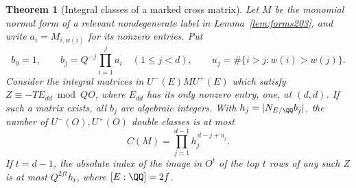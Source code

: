 \documentclass[a4paper,11pt]{article}
\newtheorem{theorem}[proposition]{Theorem}
\theoremstyle{definition}
\theoremstyle{remark}
\numberwithin{equation}{section}
\begin{document}
\begin{theorem}[Integral classes of a marked cross matrix]
\label{thm:crossclasses230}
Let \(M\) be the monomial normal form of a relevant
nondegenerate label in Lemma~\ref{lem:forms203}, and write
\(a_i=M_{i,w(i)}\) for its nonzero entries. Put
\[
 b_0=1,\qquad b_j=Q^{-j}\prod_{i=1}^j a_i\quad(1\le j<d),
 \qquad
 u_j=\#\{i>j:w(i)>w(j)\}.
\]
Consider the integral matrices in \(U^-(E)M U^+(E)\)
which satisfy \(Z\equiv-T E_{dd}\bmod QO\), where
\(E_{dd}\) has its only nonzero entry, one, at \((d,d)\).
If such a matrix exists, all \(b_j\) are algebraic integers.
With \(h_j=|N_{E/\QQ}b_j|\), the number of
\(U^-(O),U^+(O)\) double classes is at most
\[
             C(M)=\prod_{j=1}^{d-1} h_j^{\,d-j+u_j}.
\]
If \(t=d-1\), the absolute index of the image in \(O^t\)
of the top \(t\) rows of any such \(Z\) is at most
\(Q^{2ft}h_t\), where \([E:\QQ]=2f\).
\end{theorem}
\end{document}
